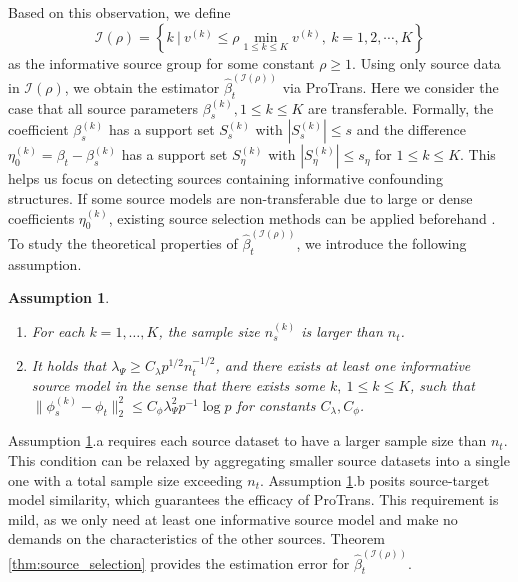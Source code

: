 \documentclass[12pt]{article}
\newtheorem{assump}{Assumption}
\begin{document}
Based on this observation, we define 
$$\mathcal{I}(\rho) = \left\{k\ |\ v^{(k)} \le \rho\min_{1\le k\le K}v^{(k)}, \ k=1,2,\cdots, K \right\}$$
as the informative source group for some constant $\rho \ge 1$. Using only source data in $\mathcal{I}(\rho)$, we obtain the estimator $\hat{\beta}_t^{(\mathcal{I}(\rho))}$ via ProTrans. Here we consider the case that all source parameters $\beta_s^{(k)},1\le k\le K$ are transferable. Formally, the coefficient $\beta_s^{(k)}$ has a support set $S_s^{(k)}$ with $|S_s^{(k)}|\le s$ and the difference $\eta_0^{(k)} = \beta_t - \beta_s^{(k)}$ has a support set $S_\eta^{(k)}$ with $|S_\eta^{(k)}| \le s_\eta$ for $1\le k\le K$. This helps us focus on detecting sources containing informative confounding structures. If some source models are non-transferable due to large or dense coefficients $\eta_0^{(k)}$, existing source selection methods can be applied beforehand \citep{li2022transfer}. To study the theoretical properties of $\hat{\beta}_t^{(\mathcal{I}(\rho))}$, we introduce the following assumption.
\begin{assump}
\label{assum:source_detection}
    \begin{enumerate}
        \item[a.] For each $k=1,\ldots,K$, the sample size $n_s^{(k)}$ is larger than $n_t$. 
        \item[b.] It holds that $\lambda_\Psi \ge C_{\lambda} p^{1/2}n_t^{-1/2}$, and there exists at least one informative source model in the sense that there exists some $k, \ 1\le k\le K$, such that $\|\phi_s^{(k)}-\phi_t\|^2_2 \le C_{\phi}\lambda_\Psi^2p^{-1}\log p$ for constants $C_{\lambda},C_{\phi}$. 
    \end{enumerate}
\end{assump}
Assumption \ref{assum:source_detection}.a requires each source dataset to have a larger sample size than $n_t$. This condition can be relaxed by aggregating smaller source datasets into a single one with a total sample size exceeding $n_t$. %
Assumption \ref{assum:source_detection}.b posits source-target model similarity, which guarantees the efficacy of ProTrans. This requirement is mild, as we only need at least one informative source model and make no demands on the characteristics of the other sources.
 Theorem \ref{thm:source_selection} provides the estimation error for $\hat{\beta}_t^{(\mathcal{I}(\rho))}$.
\end{document}
